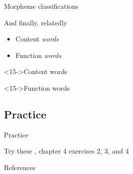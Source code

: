 \documentclass{beamer}
\newcommand{\subtwofour}{Morpheme classifications}
\newcommand{\subtwofive}{Practice}
\begin{document}
\begin{frame}{\subtwofour}
{\begin{block}{And finally, relatedly}
            \begin{itemize}
              \item Content \emph{words}
              \item Function \emph{words}
            \end{itemize}
          \end{block}
          \begin{alertblock}<15->{Content words}
            
          \end{alertblock}
          \begin{alertblock}<15->{Function words}
            
          \end{alertblock}
        }
      \end{frame}

    \subsection{\subtwofive}
      \begin{frame}{\subtwofive}
        \begin{block}{Try these}
          \textcite{dawson_language_2016}, chapter 4 exercises 2, 3, and 4
        \end{block}
      \end{frame}

    \begin{frame}{References}
      \printbibliography
    \end{frame}
\end{document}
